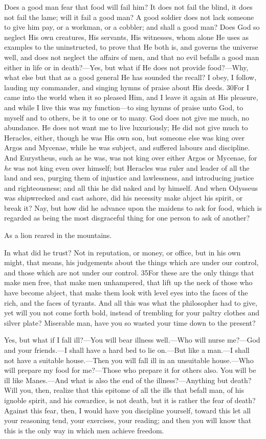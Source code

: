 Does a good man fear that food will fail him? It does not fail the blind, it does not fail the lame; will it fail a good man? A good soldier does not lack someone to give him pay, or a workman, or a cobbler; and shall a good man? Does God so neglect His own creatures, His servants, His witnesses, whom alone He uses as examples to the uninstructed, to prove that He both is, and governs the universe well, and does not neglect the affairs of men, and that no evil befalls a good man either in life or in death?—Yes, but what if He does not provide food?—Why, what else but that as a good general He has sounded the recall? I obey, I follow, lauding my commander, and singing hymns of praise about His deeds. 30For I came into the world when it so pleased Him, and I leave it again at His pleasure, and while I live this was my function—to sing hymns of praise unto God, to myself and to others, be it to one or to many. God does not give me much, no abundance. He does not want me to live luxuriously; He did not give much to Heracles, either, though he was His own son, but someone else was king over Argos and Mycenae, while he was subject, and suffered labours and discipline. And Eurystheus, such as he was, was not king over either Argos or Mycenae, for \emph{he} was not king even over himself; but Heracles was ruler and leader of all the land and sea, purging them of injustice and lawlessness, and introducing justice and righteousness; and all this he did naked and by himself. And when Odysseus was shipwrecked and cast ashore, did his necessity make abject his spirit, or break it? Nay, but how did he advance upon the maidens to ask for food, which is regarded as being the most disgraceful thing for one person to ask of another?

As a lion reared in the mountains.

In what did he trust? Not in reputation, or money, or office, but in his own might, that means, his judgements about the things which are under our control, and those which are not under our control. 35For these are the only things that make men free, that make men unhampered, that lift up the neck of those who have become abject, that make them look with level eyes into the faces of the rich, and the faces of tyrants. And all this was what the philosopher had to give, yet will you not come forth bold, instead of trembling for your paltry clothes and silver plate? Miserable man, have you so wasted your time down to the present?

Yes, but what if I fall ill?—You will bear illness well.—Who will nurse me?—God and your friends.—I shall have a hard bed to lie on.—But like a man.—I shall not have a suitable house.—Then you will fall ill in an unsuitable house.—Who will prepare my food for me?—Those who prepare it for others also. You will be ill like Manes.—And what is also the end of the illness?—Anything but death? Will you, then, realize that this epitome of all the ills that befall man, of his ignoble spirit, and his cowardice, is not death, but it is rather the fear of death? Against this fear, then, I would have you discipline yourself, toward this let all your reasoning tend, your exercises, your reading; and then you will know that this is the only way in which men achieve freedom.

